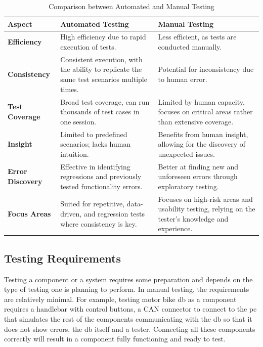 \begin{table}[ht]
\centering
\caption{Comparison between Automated and Manual Testing \cite{leloudas2023, shiwangi2014}}
\label{tab:comparison automated vs manual testing}
\begin{tabular}{|p{3cm}|p{6cm}|p{6cm}|}
\hline
\textbf{Aspect} & \textbf{Automated Testing} & \textbf{Manual Testing} \\ \hline
\textbf{Efficiency} & High efficiency due to rapid execution of tests. & Less efficient, as tests are conducted manually. \\ \hline
\textbf{Consistency} & Consistent execution, with the ability to replicate the same test scenarios multiple times. & Potential for inconsistency due to human error. \\ \hline
\textbf{Test Coverage} & Broad test coverage, can run thousands of test cases in one session. & Limited by human capacity, focuses on critical areas rather than extensive coverage. \\ \hline
\textbf{Insight} & Limited to predefined scenarios; lacks human intuition. & Benefits from human insight, allowing for the discovery of unexpected issues. \\ \hline
\textbf{Error Discovery} & Effective in identifying regressions and previously tested functionality errors. & Better at finding new and unforeseen errors through exploratory testing. \\ \hline
\textbf{Focus Areas} & Suited for repetitive, data-driven, and regression tests where consistency is key. & Focuses on high-risk areas and usability testing, relying on the tester's knowledge and experience. \\ \hline
\end{tabular}
\end{table}

\subsection{Testing Requirements}
Testing a component or a system requires some preparation and depends on the type of testing one is planning to perform. In manual testing, the requirements are relatively minimal. For example, testing motor bike \gls{db} as a component requires a handlebar with control buttons, a CAN connector to connect to the pc that simulates the rest of the components communicating with the \gls{db} so that it does not show errors, the \gls{db} itself and a tester. Connecting all these components correctly will result in a component fully functioning and ready to test.

